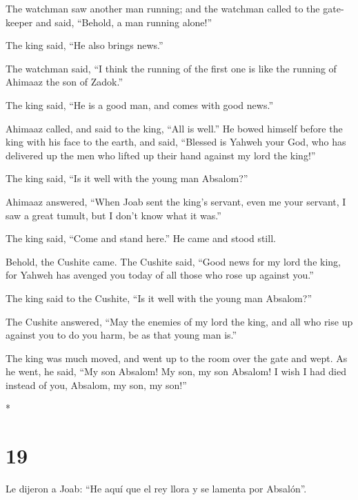 \begin{paracol}{2}
\begin{otherlanguage}{english}
 The watchman saw another man running; and the watchman
called to the gatekeeper and said, ``Behold, a man running alone!''

The king said, ``He also brings news.''

 The watchman said, ``I think the running of the first
one is like the running of Ahimaaz the son of Zadok.''

The king said, ``He is a good man, and comes with good news.''

 Ahimaaz called, and said to the king, ``All is well.''
He bowed himself before the king with his face to the earth, and said,
``Blessed is Yahweh your God, who has delivered up the men who lifted up
their hand against my lord the king!''

 The king said, ``Is it well with the young man
Absalom?''

Ahimaaz answered, ``When Joab sent the king's servant, even me your
servant, I saw a great tumult, but I don't know what it was.''

 The king said, ``Come and stand here.'' He came and
stood still.

 Behold, the Cushite came. The Cushite said, ``Good news
for my lord the king, for Yahweh has avenged you today of all those who
rose up against you.''

 The king said to the Cushite, ``Is it well with the
young man Absalom?''

The Cushite answered, ``May the enemies of my lord the king, and all who
rise up against you to do you harm, be as that young man is.''

 The king was much moved, and went up to the room over
the gate and wept. As he went, he said, ``My son Absalom! My son, my son
Absalom! I wish I had died instead of you, Absalom, my son, my son!''

\end{otherlanguage}

\switchcolumn[0]*

\hypertarget{section-36}{%
\section{19}\label{section-36}}

 Le dijeron a Joab: ``He aquí que el rey llora y se
lamenta por Absalón''.

\hypertarget{efecto-maligno-del-dolor-de-david-en-el-ejuxe9rcito-la-reprensiuxf3n-de-joab-david-se-levanta}{%
}
\end{paracol}
